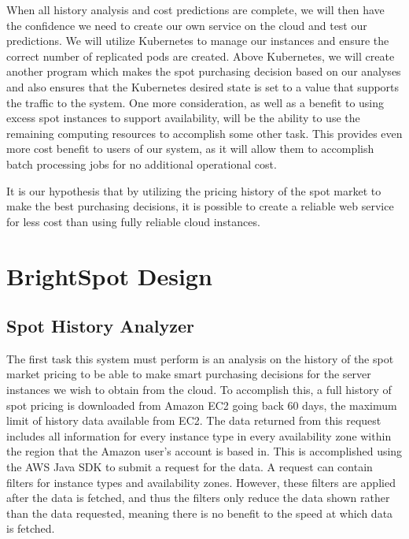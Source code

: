 \documentclass[thesis,proposal]{umassthesis}  %
\begin{document}
When all history analysis and cost predictions are complete, we will then have the confidence we need to create our own service on the cloud and test our predictions. We will utilize Kubernetes to manage our instances and ensure the correct number of replicated pods are created. Above Kubernetes, we will create another program which makes the spot purchasing decision based on our analyses and also ensures that the Kubernetes desired state is set to a value that supports the traffic to the system. One more consideration, as well as a benefit to using excess spot instances to support availability, will be the ability to use the remaining computing resources to accomplish some other task. This provides even more cost benefit to users of our system, as it will  allow them to accomplish batch processing jobs for no additional operational cost. 

    It is our hypothesis that by utilizing the pricing history of the spot market to make the best purchasing decisions, it is possible to create a reliable web service for less cost than using fully reliable cloud instances.









\chapter{BrightSpot Design}

\section{Spot History Analyzer}

The first task this system must perform is an analysis on the history of the spot market pricing to be able to make smart purchasing decisions for the server instances we wish to obtain from the cloud. To accomplish this, a full history of spot pricing is downloaded from Amazon EC2 going back 60 days, the maximum limit of history data available from EC2. The data returned from this request includes all information for every instance type in every availability zone within the region that the Amazon user's account is based in. This is accomplished using the AWS Java SDK to submit a request for the data. A request can contain filters for instance types and availability zones. However, these filters are applied after the data is fetched, and thus the filters only reduce the data shown rather than the data requested, meaning there is no benefit to the speed at which data is fetched.\par
\end{document}
